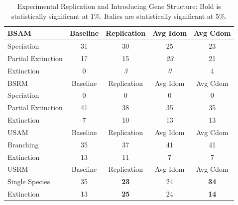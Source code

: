 \documentclass[conference]{IEEEtran}
\begin{document}
\begin{table}
\centering
    \caption{
        Experimental Replication and Introducing Gene Structure: Bold is statistically significant at 1\%. Italics are statistically significant at 5\%.}
    \begin{tabular}{| p{2.00cm} *{4}{|c} |}
        \hline
        BSAM & Baseline & Replication & Avg Idom & Avg Cdom \\ \hline
        Speciation & 31 & 30 & 25 & 23 \\ \hline
        Partial Extinction & 17 & 15 & \textit{23} & 21 \\ \hline
        Extinction & 0 & \textit{3} & \textit{0} & 4 \\ \hline
        BSRM & Baseline & Replication & Avg Idom & Avg Cdom \\ \hline
        Speciation & 0 & 0 & 0 & 0 \\ \hline
        Partial Extinction & 41 & 38 & 35 & 35 \\ \hline
        Extinction & 7 & 10 & 13 & 13 \\ \hline
        USAM & Baseline & Replication & Avg Idom & Avg Cdom \\ \hline
        Branching & 35 & 37 & 41 & 41 \\ \hline
        Extinction & 13 & 11 & 7 & 7 \\ \hline
        USRM & Baseline & Replication & Avg Idom & Avg Cdom \\ \hline
        Single Species & 35 & \textbf{23} & 24 & \textbf{34}\\ \hline
        Extinction & 13 & \textbf{25} & 24 & \textbf{14} \\ \hline
    \end{tabular}
    \label{table:EXP2}
\end{table}
\end{document}
